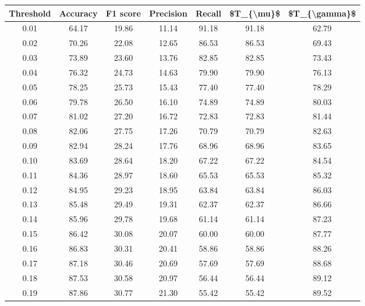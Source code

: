 \begin{tabular}{|c|c|c|c|c|c|c|}
\hline
 Threshold &  Accuracy &  F1 score &  Precision &  Recall &  \$T\_\{\textbackslash mu\}\$ &  \$T\_\{\textbackslash gamma\}\$ \\
\hline
      0.01 &     64.17 &     19.86 &      11.14 &   91.18 &      91.18 &         62.79 \\
      0.02 &     70.26 &     22.08 &      12.65 &   86.53 &      86.53 &         69.43 \\
      0.03 &     73.89 &     23.60 &      13.76 &   82.85 &      82.85 &         73.43 \\
      0.04 &     76.32 &     24.73 &      14.63 &   79.90 &      79.90 &         76.13 \\
      0.05 &     78.25 &     25.73 &      15.43 &   77.40 &      77.40 &         78.29 \\
      0.06 &     79.78 &     26.50 &      16.10 &   74.89 &      74.89 &         80.03 \\
      0.07 &     81.02 &     27.20 &      16.72 &   72.83 &      72.83 &         81.44 \\
      0.08 &     82.06 &     27.75 &      17.26 &   70.79 &      70.79 &         82.63 \\
      0.09 &     82.94 &     28.24 &      17.76 &   68.96 &      68.96 &         83.65 \\
      0.10 &     83.69 &     28.64 &      18.20 &   67.22 &      67.22 &         84.54 \\
      0.11 &     84.36 &     28.97 &      18.60 &   65.53 &      65.53 &         85.32 \\
      0.12 &     84.95 &     29.23 &      18.95 &   63.84 &      63.84 &         86.03 \\
      0.13 &     85.48 &     29.49 &      19.31 &   62.37 &      62.37 &         86.66 \\
      0.14 &     85.96 &     29.78 &      19.68 &   61.14 &      61.14 &         87.23 \\
      0.15 &     86.42 &     30.08 &      20.07 &   60.00 &      60.00 &         87.77 \\
      0.16 &     86.83 &     30.31 &      20.41 &   58.86 &      58.86 &         88.26 \\
      0.17 &     87.18 &     30.46 &      20.69 &   57.69 &      57.69 &         88.68 \\
      0.18 &     87.53 &     30.58 &      20.97 &   56.44 &      56.44 &         89.12 \\
      0.19 &     87.86 &     30.77 &      21.30 &   55.42 &      55.42 &         89.52 \\

\end{tabular}
